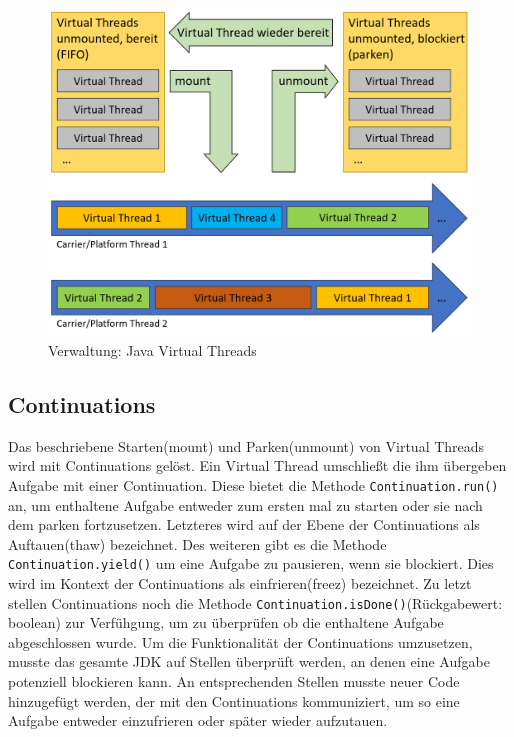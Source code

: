 \documentclass[fontsize=12pt,paper=a4,twoside=semi,parskip=half-,headsepline,headinclude]{scrreprt}
\newcommand{\code}[1]{\texttt{#1}}
\begin{document}
\begin{figure}[h]
	\centering
	\includegraphics[scale=0.5]{figures/VirtualThreadsAblauf.png}
	\caption{Verwaltung: Java Virtual Threads}
	\label{fig:VirtualThreadsAblauf}
\end{figure}

\subsection{Continuations}

Das beschriebene Starten(mount) und Parken(unmount) von Virtual Threads wird mit Continuations gelöst. Ein Virtual Thread umschließt die ihm übergeben Aufgabe mit einer Continuation. Diese bietet die Methode \code{Continuation.run()} an, um enthaltene Aufgabe entweder zum ersten mal zu starten oder sie nach dem parken fortzusetzen. Letzteres wird auf der Ebene der Continuations als Auftauen(thaw) bezeichnet. Des weiteren gibt es die Methode \code{Continuation.yield()} um eine Aufgabe zu pausieren, wenn sie blockiert. Dies wird im Kontext der Continuations als einfrieren(freez) bezeichnet. Zu letzt stellen Continuations noch die Methode \code{Continuation.isDone()}(Rückgabewert: boolean) zur Verfühgung, um zu überprüfen ob die enthaltene Aufgabe abgeschlossen wurde. Um die Funktionalität der Continuations umzusetzen, musste das gesamte JDK auf Stellen überprüft werden, an denen eine Aufgabe potenziell blockieren kann. An entsprechenden Stellen musste neuer Code hinzugefügt werden, der mit den Continuations kommuniziert, um so eine Aufgabe entweder einzufrieren oder später wieder aufzutauen.\cite{Pressler2023b}
\end{document}
